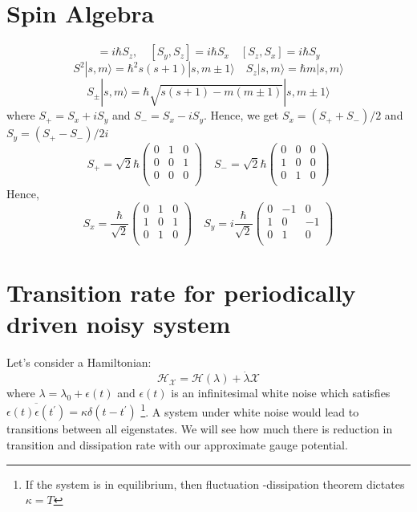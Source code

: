\documentclass[11pt,a4paper]{article}
\begin{document}
\section{Spin Algebra}\label{sec.spin_alegbra}
\begin{equation}
[S_x, S_y]=i \hbar S_z, \quad [S_y, S_z]=i \hbar S_x \quad [S_z, S_x]=i \hbar S_y
\end{equation}
\begin{equation}
S^2|s ,m \rangle = \hbar^2 s(s+1)|s ,m\pm 1\rangle  \quad S_z|s ,m \rangle = \hbar m |s ,m \rangle
\end{equation}
\begin{equation}
S_{\pm}|s, m\rangle = \hbar\sqrt{s(s+1)-m(m \pm 1)}|s,m \pm 1\rangle
\end{equation}
where $S_+ = S_x + iS_y$ and $S_- = S_x - iS_y $. Hence, we get $S_x = (S_+ + S_-)/2$ and $S_y = (S_+ - S_-)/2i $
\begin{equation}
S_+= \sqrt{2} \hbar\begin{pmatrix}
0 & 1 & 0\\
0 & 0 & 1\\
0 & 0 & 0\\
\end{pmatrix}
\quad
S_-=\sqrt{2} \hbar 
\begin{pmatrix}
0 & 0 & 0\\
1 & 0 & 0\\
0 & 1 & 0\\
\end{pmatrix}
\end{equation}
Hence, \begin{equation}
S_x= \frac{\hbar}{\sqrt{2} }
\begin{pmatrix}
0 & 1 & 0\\
1 & 0 & 1\\
0 & 1 & 0\\
\end{pmatrix} \quad
S_y=  i \frac{\hbar}{\sqrt{2} }
\begin{pmatrix}
0 & -1 & 0\\
1 & 0 & -1\\
0 & 1 & 0\\
\end{pmatrix}
\end{equation}



\section{Transition rate for periodically driven noisy system}
Let's consider a Hamiltonian:
\begin{equation}
\mathcal{H}_{\mathcal{X}} = \mathcal{H} (\lambda) + \dot{\lambda} \mathcal{X}
\end{equation}
where $\lambda= \lambda_0 + \epsilon(t)$ and  $\epsilon(t)$  is an infinitesimal white noise which satisfies $\overline{ \epsilon(t) \epsilon(t^{\prime})}= \kappa \delta(t -t^{\prime})$ \footnote{If the system is in equilibrium, then fluctuation -dissipation theorem dictates $\kappa = T$}. 
A system under white noise would lead to transitions between all eigenstates. We will see how much there is reduction in transition and dissipation rate with our approximate gauge potential.
\end{document}
